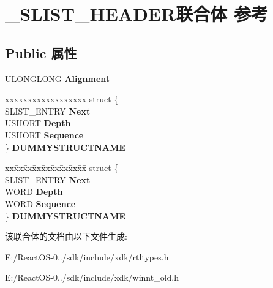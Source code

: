 \hypertarget{union___s_l_i_s_t___h_e_a_d_e_r}{}\section{\+\_\+\+S\+L\+I\+S\+T\+\_\+\+H\+E\+A\+D\+E\+R联合体 参考}
\label{union___s_l_i_s_t___h_e_a_d_e_r}
\subsection*{Public 属性}
\begin{DoxyCompactItemize}
\item 
\mbox{\label{union___s_l_i_s_t___h_e_a_d_e_r_a12ec1a4da6684e5a2a31a1a222053897}} 
U\+L\+O\+N\+G\+L\+O\+NG {\bfseries Alignment}
\item 
\mbox{\label{union___s_l_i_s_t___h_e_a_d_e_r_af1ad476b188d2239111c09c32c932a4f}} 
\begin{tabbing}
xx\=xx\=xx\=xx\=xx\=xx\=xx\=xx\=xx\=\kill
struct \{\\
\>SLIST\_ENTRY {\bfseries Next}\\
\>USHORT {\bfseries Depth}\\
\>USHORT {\bfseries Sequence}\\
\} {\bfseries DUMMYSTRUCTNAME}\\

\end{tabbing}\item 
\mbox{\label{union___s_l_i_s_t___h_e_a_d_e_r_a18b5592475329540d14cc8c14d21a999}} 
\begin{tabbing}
xx\=xx\=xx\=xx\=xx\=xx\=xx\=xx\=xx\=\kill
struct \{\\
\>SLIST\_ENTRY {\bfseries Next}\\
\>WORD {\bfseries Depth}\\
\>WORD {\bfseries Sequence}\\
\} {\bfseries DUMMYSTRUCTNAME}\\

\end{tabbing}\end{DoxyCompactItemize}


该联合体的文档由以下文件生成\+:\begin{DoxyCompactItemize}
\item 
E\+:/\+React\+O\+S-\/0../sdk/include/xdk/rtltypes.\+h\item 
E\+:/\+React\+O\+S-\/0../sdk/include/xdk/winnt\+\_\+old.\+h\end{DoxyCompactItemize}
